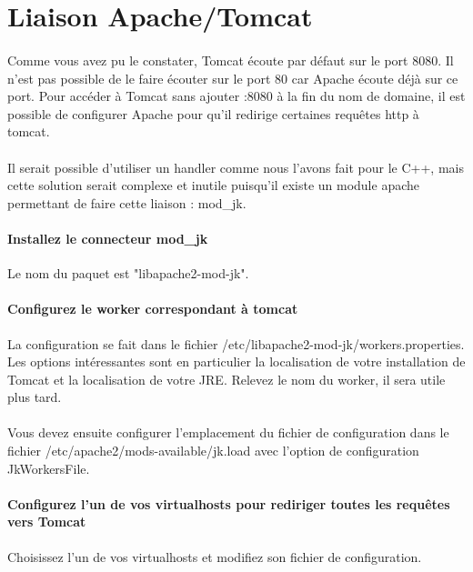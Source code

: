 \documentclass[12pt,a4paper]{article}
\begin{document}
\section{Liaison Apache/Tomcat}

\paragraph{}
Comme vous avez pu le constater, Tomcat écoute par défaut sur le port 8080. Il n'est pas possible de le faire écouter sur le port 80 car Apache écoute déjà sur ce port. Pour accéder à Tomcat sans ajouter :8080 à la fin du nom de domaine, il est possible de configurer Apache pour qu'il redirige certaines requêtes http à tomcat.

\paragraph{}
Il serait possible d'utiliser un handler comme nous l'avons fait pour le C++, mais cette solution serait complexe et inutile puisqu'il existe un module apache permettant de faire cette liaison : mod\_jk.

\paragraph{Installez le connecteur mod\_jk\\}
Le nom du paquet est "libapache2-mod-jk". 

\paragraph{Configurez le worker correspondant à tomcat\\}
La configuration se fait dans le fichier /etc/libapache2-mod-jk/workers.properties. Les options intéressantes sont en particulier la localisation de votre installation de Tomcat et la localisation de votre JRE. Relevez le nom du worker, il sera utile plus tard.

\paragraph{}
Vous devez ensuite configurer l'emplacement du fichier de configuration dans le fichier /etc/apache2/mods-available/jk.load avec l'option de configuration JkWorkersFile.

\paragraph{Configurez l'un de vos virtualhosts pour rediriger toutes les requêtes vers Tomcat\\}
Choisissez l'un de vos virtualhosts et modifiez son fichier de configuration.
\end{document}
